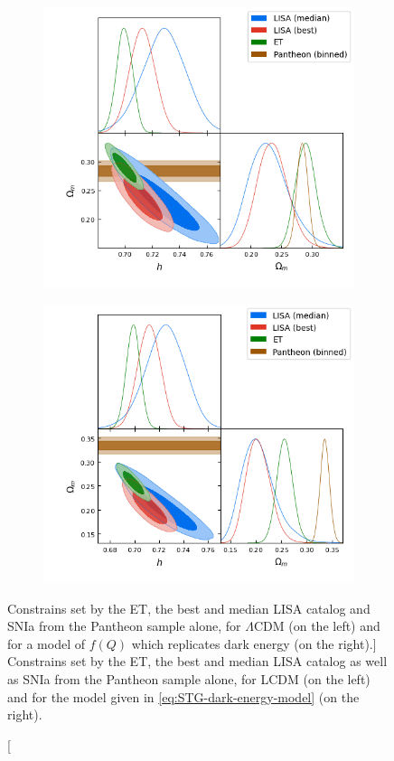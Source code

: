 \begin{figure}[h!]
    \begin{subfigure}[b]{0.495\textwidth}
        \centering
        \includegraphics[width=\textwidth]{figures/LCDM-SNIa-tension.png}
    \end{subfigure}
    \hfill
    \centering
    \begin{subfigure}[b]{0.495\textwidth}
        \centering
        \includegraphics[width=\textwidth]{figures/fotis-SNIa-tension.png}
    \end{subfigure}
    \caption
    [Constrains set by the ET, the best and median LISA catalog and SNIa from the Pantheon sample alone, for $\Lambda$CDM (on the left) and for a model of $f(Q)$ which replicates dark energy (on the right).]
    {Constrains set by the \gls{ET}, the best and median \gls{LISA} catalog as well as \gls{SNIa} from the Pantheon sample alone, for \gls{LCDM} (on the left) and for the model given in \cref{eq:STG-dark-energy-model} (on the right).}
    \label{fig:SNIa-tension}
\end{figure}

